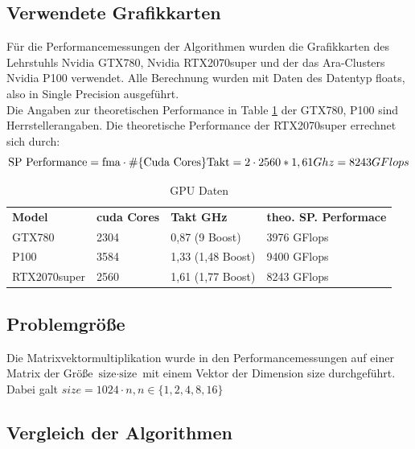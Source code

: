 \documentclass[10pt,a4paper]{article}
\begin{document}
	 \subsection{Verwendete Grafikkarten}
	 Für die Performancemessungen der Algorithmen wurden die Grafikkarten des Lehrstuhls Nvidia GTX780, Nvidia RTX2070super und der das Ara-Clusters Nvidia P100 verwendet. Alle Berechnung wurden mit Daten des Datentyp floats, also in Single Precision ausgeführt.\\
	 Die Angaben zur theoretischen Performance in Table \ref{GPU Daten} der GTX780, P100 sind Herrstellerangaben. Die theoretische Performance der RTX2070super errechnet sich durch: $$\text{SP Performance}= \text{fma}\cdot \# \{\text{Cuda Cores}\} \text{Takt}\\
	 =2\cdot 2560*1,61 Ghz\\
	 =8243 GFlops$$
	 \begin{table}
	 	\centering
	 	\begin{tabular}{llll}
	 		\textbf{Model}  & \textbf{cuda Cores} & \textbf{Takt GHz}  & \textbf{theo. SP. Performace} \\
	 		GTX780           & 2304       & 0,87 (9 Boost) & 3976 GFlops   \\
	 		P100       & 3584 & 1,33 (1,48 Boost) &9400     GFlops        \\
	 		RTX2070super        & 2560 & 1,61 (1,77 Boost) &   8243 GFlops         \\
	 	\end{tabular}
	 	
	 	\caption{GPU Daten}
	 	\label{GPU Daten}
	 	
	 \end{table}
 	\subsection{Problemgröße}
 	Die Matrixvektormultiplikation wurde in den Performancemessungen auf einer Matrix der Größe $\text{size}\cdot \text{size}$ mit einem Vektor der Dimension size durchgeführt. Dabei galt $size=1024 \cdot n, n\in\{1,2,4,8,16\}$
	 \subsection{Vergleich der Algorithmen}
\end{document}
